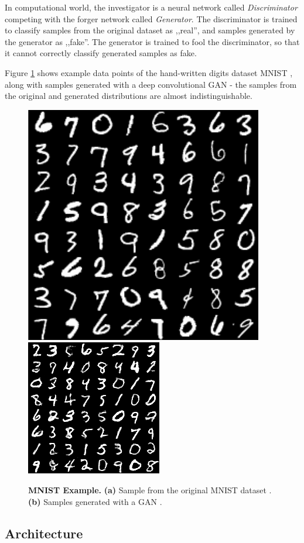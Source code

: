 \documentclass[12pt]{report}
\begin{document}
In computational world, the investigator is a neural network called \textit{Discriminator} competing with the forger network called \textit{Generator}. The discriminator is trained to classify samples from the original dataset as ,,real'', and samples generated by the generator as ,,fake''. The generator is trained to fool the discriminator, so that it cannot correctly classify generated samples as fake.

\pagebreak
Figure \ref{fig:mnist} shows example data points of the hand-written digits dataset MNIST \cite{lecun_mnist_nodate}, along with samples generated with a deep convolutional GAN \cite{kim_dcgan-tensorflow_2018} - the samples from the original and generated distributions are almost indistinguishable.

\begin{figure}[t]
\centering
{}
{\includegraphics[width=.4\linewidth]{02_background/mnist_orig}}\hspace{0.5cm}
{\includegraphics[width=.4\linewidth]{02_background/mnist_dcgan}}
\caption{\label{fig:mnist} \textbf{MNIST Example.}
\textbf{(a)} Sample from the original MNIST dataset \cite{lecun_mnist_nodate}. \textbf{(b)} Samples generated with a GAN \cite{kim_dcgan-tensorflow_2018}.}
\end{figure}

\pagebreak
\subsection{Architecture}
\end{document}
